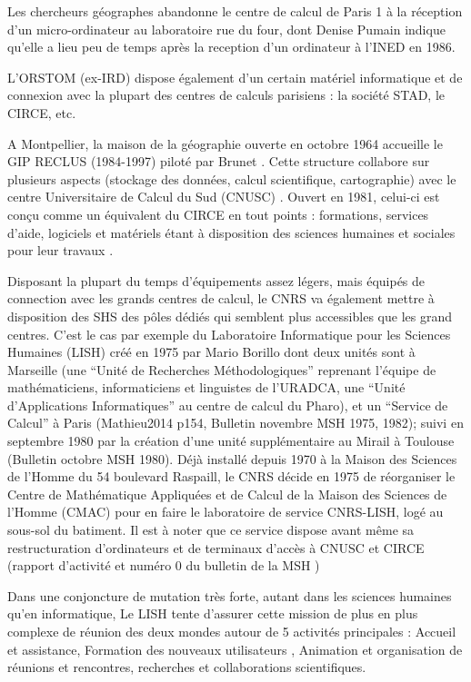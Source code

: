 Les chercheurs géographes abandonne le centre de calcul de Paris 1 à la réception d'un micro-ordinateur au laboratoire rue du four, dont Denise Pumain indique qu'elle a lieu peu de temps après la reception d'un ordinateur à l'INED en 1986. 

L’ORSTOM (ex-IRD) dispose également d’un certain matériel informatique et de connexion avec la plupart des centres de calculs parisiens : la société STAD, le CIRCE, etc. \autocite{Dejardin1992}

A Montpellier, la maison de la géographie ouverte en octobre 1964 accueille le GIP RECLUS (1984-1997) piloté par Brunet \autocite{Brunet1988}. Cette structure collabore sur plusieurs aspects (stockage des données, calcul scientifique, cartographie) avec le centre Universitaire de Calcul du Sud (CNUSC) \autocite{Waniez2010}. Ouvert en 1981, celui-ci est conçu comme un équivalent du CIRCE en tout points : formations, services d’aide, logiciels et matériels étant à disposition des sciences humaines et sociales pour leur travaux  .

Disposant la plupart du temps d'équipements assez légers, mais équipés de connection avec les grands centres de calcul, le CNRS va également mettre à disposition des SHS des pôles dédiés qui semblent plus accessibles que les grand centres. C’est le cas par exemple du Laboratoire Informatique pour les Sciences Humaines (LISH) \autocite{MSH1975} créé en 1975 par Mario Borillo dont deux unités sont à Marseille (une \enquote{Unité de Recherches Méthodologiques} reprenant l'équipe de mathématiciens, informaticiens et linguistes de l'URADCA, une \enquote{Unité d’Applications Informatiques} au centre de calcul du Pharo), et un \enquote{Service de Calcul} à Paris (Mathieu2014 p154, Bulletin novembre MSH 1975, 1982); suivi en septembre 1980 par la création d’une unité supplémentaire au Mirail à Toulouse (Bulletin octobre MSH 1980). Déjà installé depuis 1970 à la Maison des Sciences de l'Homme du 54 boulevard Raspaill, le CNRS décide en 1975 de réorganiser le Centre de Mathématique Appliquées et de Calcul de la Maison des Sciences de l’Homme (CMAC) pour en faire le laboratoire de service CNRS-LISH, logé au sous-sol du batiment. Il est à noter que ce service dispose avant même sa restructuration d’ordinateurs et de terminaux d’accès à CNUSC et CIRCE (rapport d’activité \autocite{CNRS1972} et numéro 0 du bulletin de la MSH \autocite{MSH1973})

Dans une conjoncture de mutation très forte, autant dans les sciences humaines qu'en informatique, Le LISH tente d'assurer cette mission de plus en plus complexe de réunion des deux mondes autour de 5 activités principales : Accueil et assistance, Formation des nouveaux utilisateurs , Animation et organisation de réunions et rencontres, recherches et collaborations scientifiques. \autocite{LISH1980} 

